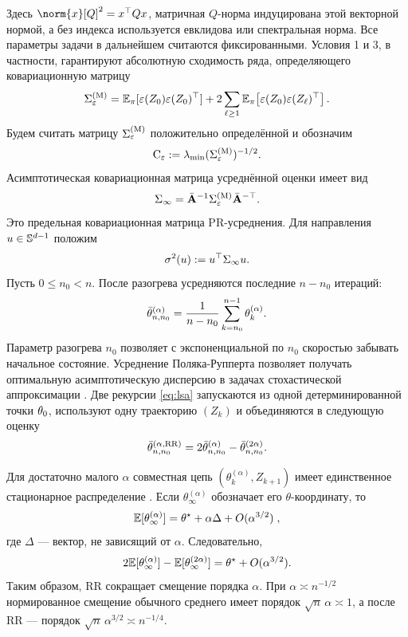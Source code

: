 \documentclass[blind]{psta}
\begin{document}
Здесь $\norm{x}[Q]^2=x^\transpose Qx$, матричная $Q$-норма индуцирована этой
векторной нормой, а без индекса используется евклидова или спектральная
норма. Все параметры задачи в дальнейшем считаются фиксированными. Условия 1
и 3, в частности, гарантируют абсолютную сходимость ряда, определяющего ковариационную матрицу
\begin{equation}\label{eq:sigmam}
 \Sigma^{(\mathrm{M})}_\varepsilon=\mathbb{E}_\pi[\varepsilon(Z_0)\varepsilon(Z_0)^\top]
 +2\sum_{\ell \geq 1}\mathbb{E}_\pi\!\left[
 \varepsilon(Z_0)\varepsilon(Z_\ell)^\top
 \right].
\end{equation}
Будем считать матрицу $\Sigma^{(\mathrm{M})}_\varepsilon$ положительно определённой и обозначим
\begin{equation}\label{eq:Cepsilon}
 \operatorname{C}_{{\varepsilon}}:=\lambda_{\min}(\Sigma^{(\mathrm{M})}_\varepsilon)^{-1/2}.
\end{equation}
Асимптотическая ковариационная матрица усреднённой оценки имеет вид
\begin{equation}\label{eq:sigmainfty}
 \Sigma_\infty=\bar{\mathbf{A}}^{-1}\Sigma^{(\mathrm{M})}_\varepsilon\bar{\mathbf{A}}^{-\top}.
\end{equation}
Это предельная ковариационная матрица PR-усреднения. Для направления
$u\in\mathbb{S}^{d-1}$ положим
\begin{equation}\label{eq:directional-variance}
 \sigma^2(u):=u^\top\Sigma_\infty u.
\end{equation}
Пусть $0\leq n_0<n$. После разогрева усредняются последние $n-n_0$
итераций:
\begin{equation}\label{eq:pr}
 \bar{\theta}_{n,n_0}^{(\alpha)}
 =\frac1{n-n_0}\sum_{k=n_0}^{n-1}\theta_k^{(\alpha)}.
\end{equation}
Параметр разогрева $n_0$ позволяет с экспоненциальной по $n_0$ скоростью забывать начальное состояние. 
Усреднение Поляка-Рупперта позволяет получать оптимальную асимптотическую дисперсию в задачах стохастической аппроксимации \cite{PolyakJuditsky1992}. Две рекурсии \eqref{eq:lsa} запускаются из одной детерминированной точки $\theta_0$,
используют одну траекторию $(Z_k)$ и объединяются в следующую оценку
\begin{equation}\label{eq:rr}
 \bar{\theta}_{n,n_0}^{(\alpha, \mathrm{RR})}
 =2\bar{\theta}_{n,n_0}^{(\alpha)}-
 \bar{\theta}_{n,n_0}^{(2\alpha)}.
\end{equation}

Для достаточно малого $\alpha$ совместная цепь
$(\theta_k^{(\alpha)},Z_{k+1})$ имеет единственное стационарное распределение
\cite[Теорема~1]{Levin2026}. Если $\theta_\infty^{(\alpha)}$ обозначает его
$\theta$-координату, то
\begin{equation}\label{eq:stationary-bias}
 \mathbb{E}[\theta_\infty^{(\alpha)}]
 =\theta^\star+\alpha\Delta+O(\alpha^{3/2}) \;,
\end{equation}
где $\Delta$ --- вектор, не зависящий от $\alpha$. Следовательно,
\[
 2\mathbb{E}[\theta_\infty^{(\alpha)}]-
 \mathbb{E}[\theta_\infty^{(2\alpha)}]
 =\theta^\star+O(\alpha^{3/2}).
\]
Таким образом, RR сокращает смещение порядка $\alpha$. При
$\alpha\asymp n^{-1/2}$ нормированное смещение обычного среднего имеет
порядок $\sqrt n\,\alpha\asymp1$, а после RR --- порядок
$\sqrt n\,\alpha^{3/2}\asymp n^{-1/4}$.
\end{document}
